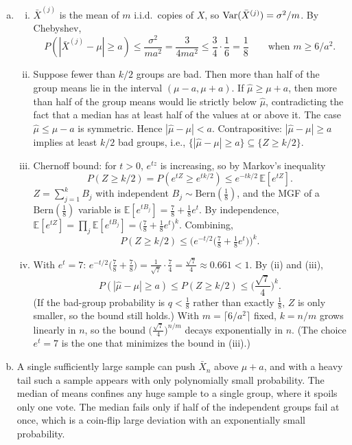 \documentclass[12pt]{article}
\newcommand{\Bern}{{\mbox{Bern}}}
\begin{document}
\begin{enumerate}
\begin{solution}
\begin{enumerate}[(a)]
\item
\begin{enumerate}[i)]
\item $\bar X^{(j)}$ is the mean of $m$ i.i.d.\ copies of $X$, so ${\rm Var}(\bar X^{(j)})=\sigma^2/m$. By Chebyshev,
\[
P(|\bar X^{(j)}-\mu|\ge a)\le\frac{\sigma^2}{ma^2}=\frac{3}{4ma^2}\le\frac34\cdot\frac16=\frac18\qquad\text{when } m\ge 6/a^2.
\]
\item Suppose fewer than $k/2$ groups are bad. Then more than half of the group means lie in the interval $(\mu-a,\mu+a)$. If $\hat\mu\ge\mu+a$, then more than half of the group means would lie strictly below $\hat\mu$, contradicting the fact that a median has at least half of the values at or above it. The case $\hat\mu\le\mu-a$ is symmetric. Hence $|\hat\mu-\mu|<a$. Contrapositive: $|\hat\mu-\mu|\ge a$ implies at least $k/2$ bad groups, i.e., $\{|\hat\mu-\mu|\ge a\}\subseteq\{Z\ge k/2\}$.
\item Chernoff bound: for $t>0$, $e^{tz}$ is increasing, so by Markov's inequality
\[
P(Z\ge k/2)=P(e^{tZ}\ge e^{tk/2})\le e^{-tk/2}\,\mathbb{E}[e^{tZ}].
\]
$Z=\sum_{j=1}^k B_j$ with independent $B_j\sim\Bern(\frac18)$, and the MGF of a $\Bern(\frac18)$ variable is $\mathbb{E}[e^{tB_j}]=\frac78+\frac18e^t$. By independence, $\mathbb{E}[e^{tZ}]=\prod_j\mathbb{E}[e^{tB_j}]=\big(\frac78+\frac18e^t\big)^k$. Combining,
\[
P(Z\ge k/2)\le\Big(e^{-t/2}\big(\tfrac78+\tfrac18e^t\big)\Big)^k.
\]
\item With $e^t=7$: $e^{-t/2}\big(\frac78+\frac78\big)=\frac1{\sqrt7}\cdot\frac74=\frac{\sqrt7}{4}\approx 0.661<1$. By (ii) and (iii),
\[
P(|\hat\mu-\mu|\ge a)\le P(Z\ge k/2)\le\Big(\frac{\sqrt7}{4}\Big)^k.
\]
(If the bad-group probability is $q<\frac18$ rather than exactly $\frac18$, $Z$ is only smaller, so the bound still holds.) With $m=\lceil 6/a^2\rceil$ fixed, $k=n/m$ grows linearly in $n$, so the bound $\big(\frac{\sqrt7}{4}\big)^{n/m}$ decays exponentially in $n$. (The choice $e^t=7$ is the one that minimizes the bound in (iii).)
\end{enumerate}

\item A single sufficiently large sample can push $\bar X_n$ above $\mu+a$, and with a heavy tail such a sample appears with only polynomially small probability. The median of means confines any huge sample to a single group, where it spoils only one vote. The median fails only if half of the independent groups fail at once, which is a coin-flip large deviation with an exponentially small probability.
\end{enumerate}
\end{solution}

\begin{problem}
\end{problem}
\begin{problem}
\end{problem}

\end{enumerate}
\end{document}
